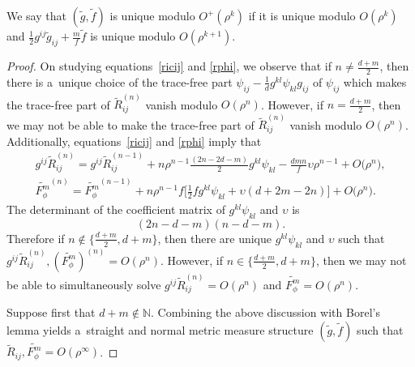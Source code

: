 \documentclass[pdftex]{sigma}
\numberwithin{equation}{section}
\begin{document}
\begin{Remark}
We say that $(\widetilde{g},\widetilde{f})$ is unique modulo $O^+(\rho^k)$ if it is unique modulo $O(\rho^{k})$ and $\frac{1}{2}g^{ij}\widetilde{g}_{ij}+\frac{m}{f}\widetilde{f}$ is unique modulo $O(\rho^{k+1})$.
\end{Remark}

\begin{proof}
On studying equations~\eqref{ricij} and \eqref{rphi}, we observe that if $n\neq \frac{d+m}{2}$, then there is a~unique choice of the trace-free part $\psi_{ij}-\frac{1}{d}g^{kl}\psi_{kl}g_{ij}$ of $\psi_{ij}$ which makes the trace-free part of $\widetilde{R}^{(n)}_{ij}$ vanish modulo $O(\rho^n)$. However, if $n=\frac{d+m}{2}$, then we may not be able to make the trace-free part of $\widetilde{R}_{ij}^{(n)}$ vanish modulo $O(\rho^n)$. Additionally, equations~\eqref{ricij} and \eqref{rphi} imply that
\begin{gather}
g^{ij}\widetilde{R}_{ij}^{(n)}=g^{ij}\widetilde{R}_{ij}^{(n-1)}
+n\rho^{n-1}\frac{(2n-2d-m)}{2}g^{kl}\psi_{kl}-\frac{dmn}{f}\upsilon \rho^{n-1}+O\big(\rho^{n}\big),\nonumber
\\
\widetilde{F_{\phi}^m}^{(n)}= \widetilde{F_{\phi}^m}^{(n-1)}
+ n\rho^{n-1}f \bigg[\frac{1}{2}fg^{kl}\psi_{kl}+\upsilon (d+2m-2n) \bigg]+O\big(\rho^{n}\big).
\label{modified-equations}
\end{gather}
The determinant of the coefficient matrix of $g^{kl}\psi_{kl}$ and $\upsilon$ is
\begin{equation*}(2n-d-m)(n-d-m).\end{equation*}
Therefore if $n\notin\{\frac{d+m}{2},d+m\}$, then there are unique $g^{kl}\psi_{kl}$ and $\upsilon$ such that $g^{ij}\widetilde{R}_{ij}^{(n)},(\widetilde{F_\phi^m})^{(n)}=O(\rho^n)$. However, if $n\in\{\frac{d+m}{2},d+m\}$, then we may not be able to simultaneously solve $g^{ij}\widetilde{R}_{ij}^{(n)}=O(\rho^n)$ and $\widetilde{F_\phi^m}=O(\rho^n)$.

Suppose first that $d+m\notin \mathbb{N}$. Combining the above discussion with Borel's lemma yields a~straight and normal metric measure structure $(\widetilde{g},\widetilde{f})$ such that $\widetilde{R}_{ij},\widetilde{F_\phi^m}=O(\rho^\infty)$.


\end{proof}
\end{document}
